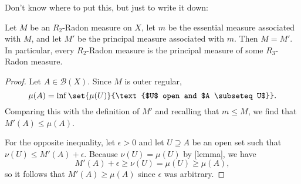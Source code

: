 \documentclass[article, a4paper, 11pt, oneside]{memoir}
\numberwithin{equation}{chapter}
\newcommand{\calB}{\mathcal{B}}
\newcommand{\borel}[1]{\calB(#1)}
\begin{document}
Don't know where to put this, but just to write it down:



\begin{proposition}
    Let $M$ be an $R_2$-Radon measure on $X$, let $m$ be the essential measure associated with $M$, and let $M'$ be the principal measure associated with $m$. Then $M = M'$. In particular, every $R_2$-Radon measure is the principal measure of some $R_3$-Radon measure.
\end{proposition}

\begin{proof}
    Let $A \in \borel{X}$. Since $M$ is outer regular,
    \begin{equation*}
        \mu(A)
            = \inf \set{\mu(U)}{\text{$U$ open and $A \subseteq U$}}.
    \end{equation*}
    Comparing this with the definition of $M'$ and recalling that $m \leq M$, we find that $M'(A) \leq \mu(A)$.

    For the opposite inequality, let $\epsilon > 0$ and let $U \supseteq A$ be an open set such that $\nu(U) \leq M'(A) + \epsilon$. Because $\nu(U) = \mu(U)$ by [lemma], we have
    \begin{equation*}
        M'(A) + \epsilon
            \geq \nu(U)
            = \mu(U)
            \geq \mu(A),
    \end{equation*}
    so it follows that $M'(A) \geq \mu(A)$ since $\epsilon$ was arbitrary.
\end{proof}


\nocite{*}

\printbibliography
\end{document}
